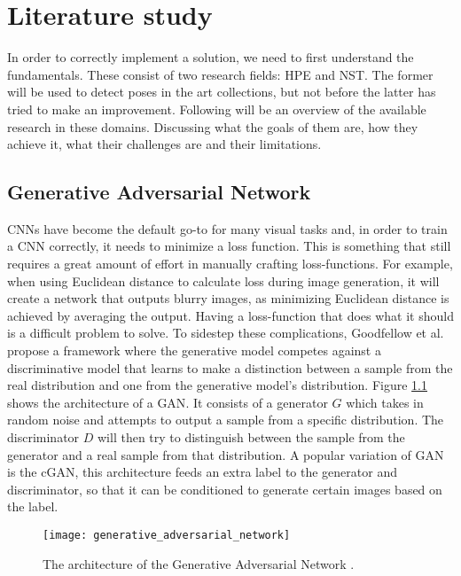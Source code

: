 \graphicspath{{images/chapter1/}}

\chapter{Literature study}
\label{chap:rel_work}
In order to correctly implement a solution, we need to first understand the fundamentals.
These consist of two research fields: HPE and \gls{NST}.
The former will be used to detect poses in the art collections, but not before the latter has tried to make an improvement.
Following will be an overview of the available research in these domains.
Discussing what the goals of them are, how they achieve it, what their challenges are and their limitations.

\section{Generative Adversarial Network}
\glspl{CNN} have become the default go-to for many visual tasks and, in order to train a CNN correctly, it needs to minimize a loss function.
This is something that still requires a great amount of effort in manually crafting loss-functions.
For example, when using Euclidean distance to calculate loss during image generation, it will create a network that outputs blurry images, as minimizing Euclidean distance is achieved by averaging the output.
Having a loss-function that does what it should is a difficult problem to solve.
To sidestep these complications, Goodfellow et al. \cite{Goodfellow2014} propose a framework where the generative model competes against a discriminative model that learns to make a distinction between a sample from the real distribution and one from the generative model's distribution.
Figure \ref{fig:generative_adversarial_network} shows the architecture of a \gls{GAN}.
It consists of a generator $G$ which takes in random noise and attempts to output a sample from a specific distribution.
The discriminator $D$ will then try to distinguish between the sample from the generator and a real sample from that distribution.
A popular variation of \gls{GAN} is the \gls{cGAN}, this architecture feeds an extra label to the generator and discriminator, so that it can be conditioned to generate certain images based on the label.

\begin{figure}[h]
	\centering
	\texttt{[image: generative\_adversarial\_network]}
	\caption{The architecture of the Generative Adversarial Network \cite{GANCookbook}.}
	\label{fig:generative_adversarial_network}
\end{figure}

